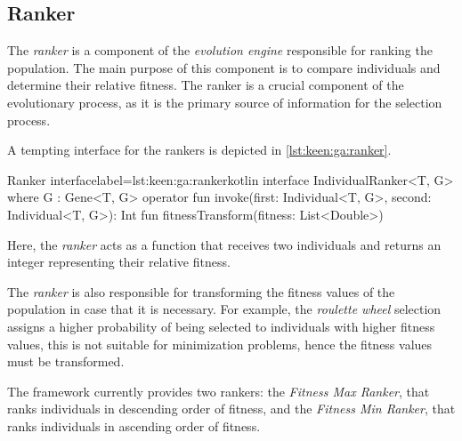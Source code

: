 \subsection{Ranker}
\label{sec:keen:ga:ranker}

  The \emph{ranker} is a component of the \emph{evolution engine} responsible for
  ranking the population.
  The main purpose of this component is to compare individuals and determine their
  relative fitness.
  The ranker is a crucial component of the evolutionary process, as it is the
  primary source of information for the selection process.

  A tempting interface for the rankers is depicted in \vref{lst:keen:ga:ranker}.

  \begin{code}{Ranker interface}{label=lst:keen:ga:ranker}{kotlin}
    interface IndividualRanker<T, G> where G : Gene<T, G> {
        operator fun invoke(first: Individual<T, G>, second: Individual<T, G>): Int
        fun fitnessTransform(fitness: List<Double>)
    }
  \end{code}

  Here, the \emph{ranker} acts as a function that receives two individuals and
  returns an integer representing their relative fitness.
  
  The \emph{ranker} is also responsible for transforming the fitness values of
  the population in case that it is necessary.
  For example, the \textit{roulette wheel} selection assigns a higher 
  probability of being selected to individuals with higher fitness values, this
  is not suitable for minimization problems, hence the fitness values must be
  transformed.

  The framework currently provides two rankers: the \textit{Fitness Max Ranker},
  that ranks individuals in descending order of fitness, and the \textit{Fitness
  Min Ranker}, that ranks individuals in ascending order of fitness.
